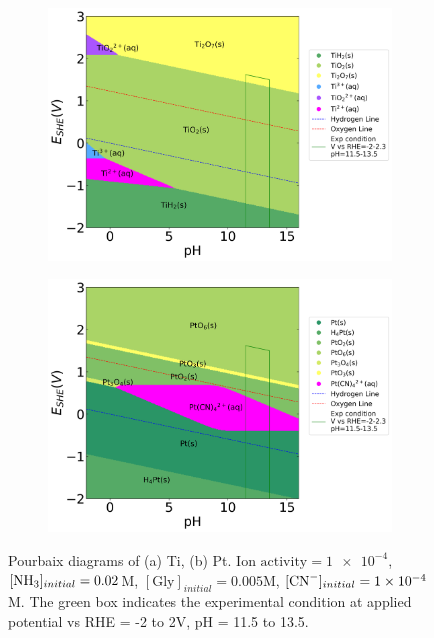 \documentclass[journal=jacsat,manuscript=article]{achemso}
\begin{document}
\begin{figure}[htbp]
    \centering
    \begin{subfigure}[b]{0.45\textwidth}
        \subcaption{}\label{fig:Ti_Pourbaix_NH3_Gly_CN}
        \includegraphics[width=\textwidth]{Figures/pourbaix_diagrams/Ti-NH3-H2O_activity=1e-04_[NH3]=0.02M_[Gly]=0.005M_[CN]=0.0001.png}
    \end{subfigure}
    \begin{subfigure}[b]{0.45\textwidth}
        \subcaption{}\label{fig:Pt_Pourbaix_NH3_Gly_CN}
        \includegraphics[width=\textwidth]{Figures/pourbaix_diagrams/Pt-NH3-H2O_activity=1e-04_[NH3]=0.02M_[Gly]=0.005M_[CN]=0.0001.png}
    \end{subfigure}
    \caption{Pourbaix diagrams of (a) Ti, (b) Pt. $\text{Ion activity}=\num{1e-4}$, $[\ce{NH3}]_{initial}= 0.02$M, $[\text{Gly}]_{initial}=0.005$M,  $[\ce{CN-}]_{initial}=\num{1e-4}$M. The green box indicates the experimental condition at applied potential vs RHE = -2 to 2V, pH = 11.5 to 13.5.}
    \label{fig:Ti_Pt_Pourbaix}
\end{figure}
\end{document}
